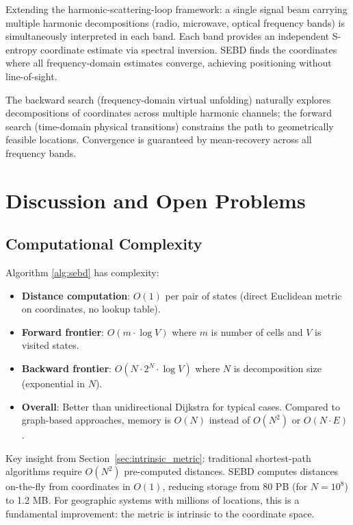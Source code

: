 \documentclass[twocolumn,11pt,a4paper]{article}
\begin{document}
Extending the harmonic-scattering-loop framework: a single signal beam carrying multiple harmonic decompositions (radio, microwave, optical frequency bands) is simultaneously interpreted in each band. Each band provides an independent S-entropy coordinate estimate via spectral inversion. SEBD finds the coordinates where all frequency-domain estimates converge, achieving positioning without line-of-sight.

The backward search (frequency-domain virtual unfolding) naturally explores decompositions of coordinates across multiple harmonic channels; the forward search (time-domain physical transitions) constrains the path to geometrically feasible locations. Convergence is guaranteed by mean-recovery across all frequency bands.

\section{Discussion and Open Problems}
\label{sec:discussion}

\subsection{Computational Complexity}

Algorithm \ref{alg:sebd} has complexity:
\begin{itemize}[nosep,leftmargin=1em]
  \item \textbf{Distance computation}: $O(1)$ per pair of states (direct Euclidean metric on coordinates, no lookup table).
  \item \textbf{Forward frontier}: $O(m \cdot \log V)$ where $m$ is number of cells and $V$ is visited states.
  \item \textbf{Backward frontier}: $O(N \cdot 2^N \cdot \log V)$ where $N$ is decomposition size (exponential in $N$).
  \item \textbf{Overall}: Better than unidirectional Dijkstra for typical cases. Compared to graph-based approaches, memory is $O(N)$ instead of $O(N^2)$ or $O(N \cdot E)$.
\end{itemize}

Key insight from Section~\ref{sec:intrinsic_metric}: traditional shortest-path algorithms require $O(N^2)$ pre-computed distances. SEBD computes distances on-the-fly from coordinates in $O(1)$, reducing storage from 80 PB (for $N=10^8$) to 1.2 MB. For geographic systems with millions of locations, this is a fundamental improvement: the metric is intrinsic to the coordinate space.
\end{document}
